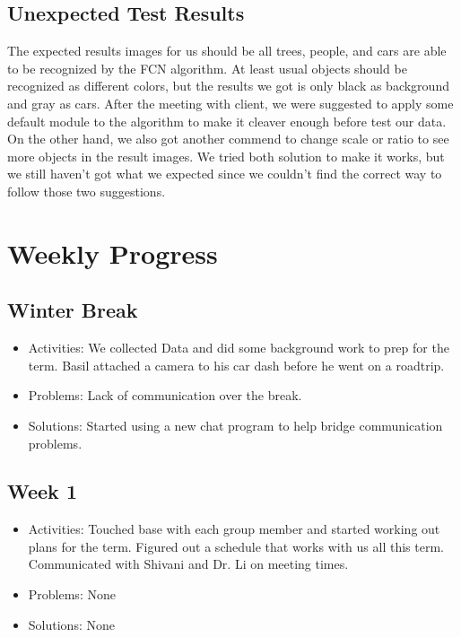 \documentclass[10pt,draftclsnofoot,onecolumn,journal,compsoc]{IEEEtran}
\begin{document}
\subsection{Unexpected Test Results}
The expected results images for us should be all trees, people, and cars are able to be recognized by the FCN algorithm. 
At least usual objects should be recognized as different colors, but the results we got is only black as background and gray as cars.
After the meeting with client, we were suggested to apply some default module to the algorithm to make it cleaver enough before test our data.
On the other hand, we also got another commend to change scale or ratio to see more objects in the result images.
We tried both solution to make it works, but we still haven't got what we expected since we couldn't find the correct way to follow those two suggestions.









\section{Weekly Progress}

\subsection{Winter Break}
\begin{itemize}
\item Activities: 
We collected Data and did some background work to prep for the term. Basil attached a camera to his car dash before he went on a roadtrip.  
\item Problems: 
Lack of communication over the break.
\item Solutions: 
Started using a new chat program to help bridge communication problems.
\end{itemize}

\subsection{Week 1}
\begin{itemize}
\item Activities: 
Touched base with each group member and started working out plans for the term. Figured out a schedule that works with us all this term. Communicated with Shivani and Dr. Li on meeting times. 
\item Problems: 
None
\item Solutions: 
None
\end{itemize}
\end{document}
